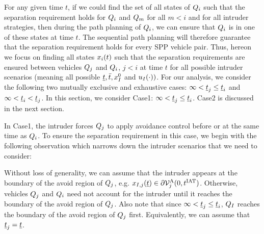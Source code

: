 For any given time $t$, if we could find the set of all states of $Q_i$ such that the separation requirement holds for $Q_i$ and $Q_m$ for all $m<i$ and for all intruder strategies, then during the path planning of $Q_i$, we can ensure that $Q_i$ is in one of these states at time $t$. The sequential path planning will therefore guarantee that the separation requirement holds for every SPP vehicle pair. Thus, hereon we focus on finding all states $x_i(t)$ such that the separation requirements are ensured between vehicles $Q_j$ and $Q_i$, $j <i$ at time $t$ for all possible intruder scenarios (meaning all possible $\underline{t}, \bar{t}, x_{I}^0$ and $u_{I}(\cdot))$. For our analysis, we consider the following two mutually exclusive and exhaustive cases: $\infty < \underline{t}_j \leq \underline{t}_i$ and $\infty < \underline{t}_i < \underline{t}_j$. %
In this section, we consider Case1: $\infty < \underline{t}_j \leq \underline{t}_i$. Case2 is discussed in the next section.  

In Case1, the intruder forces $Q_j$ to apply avoidance control before or at the same time as $Q_i$. %
To ensure the separation requirement in this case, we begin with the following observation which narrows down the intruder scenarios that we need to consider:

\begin{observation} \label{obs1_case1}
Without loss of generality, we can assume that the intruder appears at the boundary of the avoid region of $Q_j$, e.g. $x_{I, j}(\underline{t}) \in \partial \mathcal{V}^{\text{A}}_{j}(0, t^\text{IAT})$. Otherwise, vehicles $Q_j$ and $Q_i$ need not account for the intruder until it reaches the boundary of the avoid region of $Q_j$. Also note that since $\infty < \underline{t}_j \leq \underline{t}_i$, $Q_{I}$ reaches the boundary of the avoid region of $Q_j$ first. Equivalently, we can assume that $\underline{t}_j = \underline{t}$.
\end{observation}